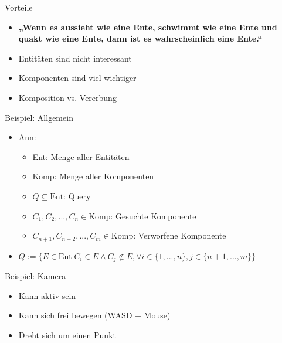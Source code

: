 \documentclass{presentation}
\begin{document}
\begin{frame}{Vorteile}
    \begin{itemize}
        \item \textbf{„Wenn es aussieht wie eine Ente, 
                        schwimmt wie eine Ente und quakt wie eine Ente, 
                        dann ist es wahrscheinlich eine Ente.“ }
        \item Entitäten sind nicht interessant
        \item Komponenten sind viel wichtiger
        \item Komposition vs. Vererbung
    \end{itemize}
\end{frame}

\begin{frame}{Beispiel: Allgemein}
    \begin{itemize}
        \item Ann:
        \begin{itemize}
            \item Ent: Menge aller Entitäten
            \item Komp: Menge aller Komponenten
            \item $Q \subseteq \text{Ent}$: Query
            \item $C_1,C_2,...,C_n \in \text{Komp}$: Gesuchte Komponente
            \item $C_{n+1},C_{n+2},...,C_m \in \text{Komp}$: Verworfene Komponente
        \end{itemize}
        \item $Q := \{ E \in \text{Ent} | C_i \in E \wedge C_j \notin E, \forall i \in \{1,...,n\}, j \in \{n+1,...,m\}\}$
    \end{itemize}
\end{frame}

\begin{frame}{Beispiel: Kamera}
    \begin{itemize}
        \item Kann aktiv sein
        \item Kann sich frei bewegen (WASD + Mouse)
        \item Dreht sich um einen Punkt
    \end{itemize}
\end{frame}
\end{document}
